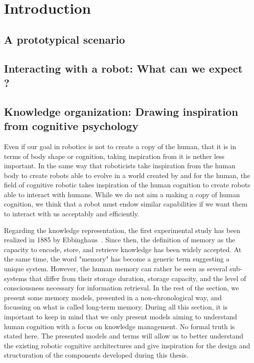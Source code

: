 
\ifdefined{}
\else
\setcounter{chapter}{0} %
\dominitoc
\faketableofcontents
\fi

\chapter{Introduction}
\minitoc

\section{A prototypical scenario}

\section{Interacting with a robot: What can we expect ?}

\section[Knowledge organization]{Knowledge organization: Drawing inspiration from cognitive psychology }

Even if our goal in robotics is not to create a copy of the human, that it is in terms of body shape or cognition, taking inspiration from it is nether less important. In the same way that roboticists take inspiration from the human body to create robots able to evolve in a world created by and for the human, the field of cognitive robotic takes inspiration of the human cognition to create robots able to interact with humans. While we do not aim a making a copy of human cognition, we think that a robot must endow similar capabilities if we want them to interact with us acceptably and efficiently.

Regarding the knowledge representation, the first experimental study has been realized in 1885 by Ebbinghaus~\cite{ebbinghaus_1885_gedachtnis}. Since then, the definition of memory as the capacity to encode, store, and retrieve knowledge \cite{roediger_1996_retrieval} has been widely accepted. At the same time, the word "memory" has become a generic term suggesting a unique system. However, the human memory can rather be seen as several sub-systems that differ from their storage duration, storage capacity, and the level of consciousness necessary for information retrieval. In the rest of the section, we present some memory models, presented in a non-chronological way, and focussing on what is called long-term memory. During all this section, it is important to keep in mind that we only present models aiming to understand human cognition with a focus on knowledge management. No formal truth is stated here. The presented models and terms will allow us to better understand the existing robotic cognitive architectures and give inspiration for the design and structuration of the components developed during this thesis.


